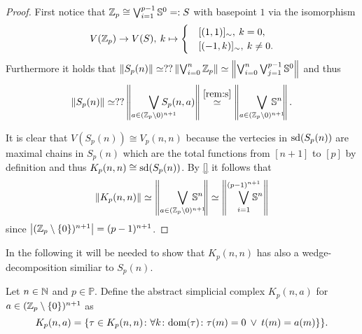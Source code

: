 \begin{proof}
  First notice that $\mathbb{Z}_p \cong \bigvee_{i=1}^{p-1}\mathbb{S}^0 =: S$ with basepoint $1$ via the isomorphism
  \begin{equation*}
    V(\mathbb{Z}_p) \to V(S), \: k \mapsto \begin{cases}
      &[(1, 1)]_\sim, \: k = 0, \\
      &[(-1,k)]_\sim, \: k \neq 0.
    \end{cases}
  \end{equation*}
  Furthermore it holds that $\lVert S_p(n) \rVert \simeq?? \left\lVert \bigvee_{i=0}^n\mathbb{Z}_p \right\rVert \simeq \left\lVert \bigvee_{i=0}^n\bigvee_{j=1}^{p-1}\mathbb{S}^0 \right\rVert$ and thus
  \begin{equation*}
    \lVert S_p(n) \rVert \simeq?? \left\lVert \bigvee_{a\in(\Z_p \setminus {0})^{n+1}} \hspace*{-17px}S_p(n,a) \right\rVert \overset{\ref{rem:s}}{\simeq} \left\lVert \bigvee_{a\in(\Z_p \setminus {0})^{n+1}}\hspace*{-15px}\mathbb{S}^n \right\rVert.
  \end{equation*}

  It is clear that $V(S_p(n)) \cong V_p(n,n)$ because the vertecies in ${\rm sd}(S_p(n))$ are maximal chains in $S_p(n)$ which are the total functions from $[n+1]$ to $[p]$ by definition and thus $K_p(n,n) \cong {\rm sd}(S_p(n))$. By \ref{} it follows that
  \begin{equation*}
    \lVert K_p(n, n) \rVert \simeq \left\lVert \bigvee_{a\in(\Z_p \setminus {0})^{n+1}}\hspace*{-15px}\mathbb{S}^n \right\rVert \simeq \left\lVert \bigvee_{i=1}^{(p-1)^{n+1}}\hspace*{-10px}\mathbb{S}^n \right\rVert
  \end{equation*}
  since $\left|(\mathbb{Z}_p\setminus\{0\})^{n+1}\right| = (p-1)^{n+1}$.
\end{proof}

In the following it will be needed to show that $K_p(n,n)$ has also a wedge-decomposition similiar to $S_p(n)$.
\begin{defin}
  Let $n\in\mathbb{N}$ and $p\in \mathbb{P}$. Define the abstract simplicial complex $K_p(n,a)$ for $a \in (\mathbb{Z}_p\setminus\{0\})^{n+1}$ as
  \begin{equation*}
    K_p(n,a) = \{\tau \in K_p(n,n)\colon \forall k\colon{\rm dom}(\tau)\colon \tau(m) = 0 \: \lor \: t(m) = a(m)\}\}.
  \end{equation*}
\end{defin}

